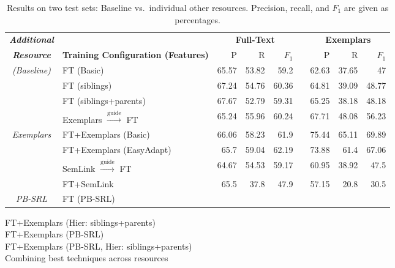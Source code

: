 \begin{table*}\centering\small
\begin{tabular}{>{\itshape}clrrr@{~~}r@{~~}rrr}
\toprule
\normalfont\textbf{Additional} & & \multicolumn{3}{c}{\textbf{Full-Text}} && \multicolumn{3}{c}{\textbf{Exemplars}} \\
\cline{3-5}\cline{7-9}
\normalfont\textbf{Resource} & \textbf{Training Configuration (Features)} & P\hphantom{11} & R\hphantom{11} & $F_1$\hphantom{0} && P\hphantom{11} & R\hphantom{11} & $F_1$\hphantom{0} \\
\midrule
(Baseline) & FT (Basic) & 65.57 & 53.82 & 59.2 && 62.63 & 37.65 & 47 \\
\midrule
\multirow{2}{*}{FN Hierarchy} & FT (siblings) & 67.24 & 54.76 & 60.36 && 64.81 & 39.09 & 48.77 \\
          & FT (siblings+parents) & 67.67 & 52.79 & 59.31 && 65.25 & 38.18 & 48.18 \\
\midrule
& Exemplars $\xrightarrow{\text{guide}}$ FT & 65.24 & 55.96 & 60.24 && 67.71 & 48.08 & 56.23\\
Exemplars & FT+Exemplars (Basic) & 66.06 & 58.23 & 61.9 && 75.44 & 65.11 & 69.89 \\
& FT+Exemplars (EasyAdapt) & 65.7 & 59.04 & 62.19 && 73.88 & 61.4 & 67.06 \\
\midrule
\multirow{2}{*}{SemLink} & SemLink $\xrightarrow{\text{guide}}$ FT & 64.67 & 54.53 & 59.17 && 60.95 & 38.92 & 47.5 \\
& FT+SemLink & 65.5 & 37.8 & 47.9 && 57.15 & 20.8 & 30.5 \\
\midrule
PB-SRL & FT (PB-SRL) \\
\bottomrule
\end{tabular}
\caption{Results on two test sets: Baseline vs.~individual other resources. 
Precision, recall, and $F_1$ are given as percentages.}
\label{tbl:results}
\end{table*}

\begin{table*}\centering\small
FT+Exemplars (Hier: siblings+parents) \\
FT+Exemplars (PB-SRL) \\
FT+Exemplars (PB-SRL, Hier: siblings+parents) \\
\caption{Combining best techniques across resources }
\end{table*}
